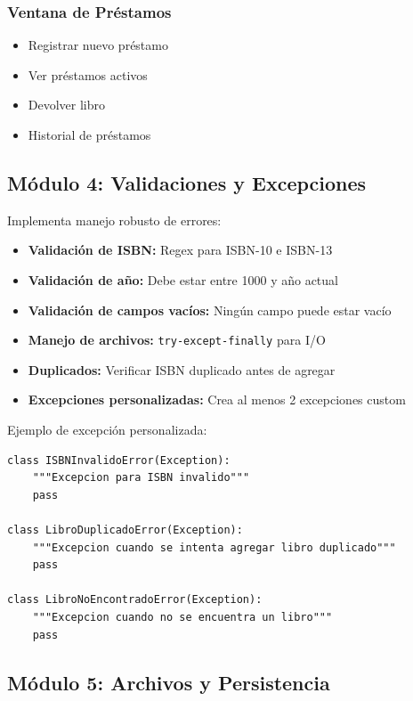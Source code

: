 \documentclass[12pt,a4paper]{article}
\begin{document}
\subsubsection{Ventana de Préstamos}
\begin{itemize}[leftmargin=*]
    \item Registrar nuevo préstamo
    \item Ver préstamos activos
    \item Devolver libro
    \item Historial de préstamos
\end{itemize}

\subsection{Módulo 4: Validaciones y Excepciones}

Implementa manejo robusto de errores:

\begin{itemize}[leftmargin=*]
    \item \textbf{Validación de ISBN:} Regex para ISBN-10 e ISBN-13
    \item \textbf{Validación de año:} Debe estar entre 1000 y año actual
    \item \textbf{Validación de campos vacíos:} Ningún campo puede estar vacío
    \item \textbf{Manejo de archivos:} \texttt{try-except-finally} para I/O
    \item \textbf{Duplicados:} Verificar ISBN duplicado antes de agregar
    \item \textbf{Excepciones personalizadas:} Crea al menos 2 excepciones custom
\end{itemize}

Ejemplo de excepción personalizada:
\begin{lstlisting}[caption=Excepciones personalizadas]
class ISBNInvalidoError(Exception):
    """Excepcion para ISBN invalido"""
    pass

class LibroDuplicadoError(Exception):
    """Excepcion cuando se intenta agregar libro duplicado"""
    pass

class LibroNoEncontradoError(Exception):
    """Excepcion cuando no se encuentra un libro"""
    pass
\end{lstlisting}

\subsection{Módulo 5: Archivos y Persistencia}
\end{document}
